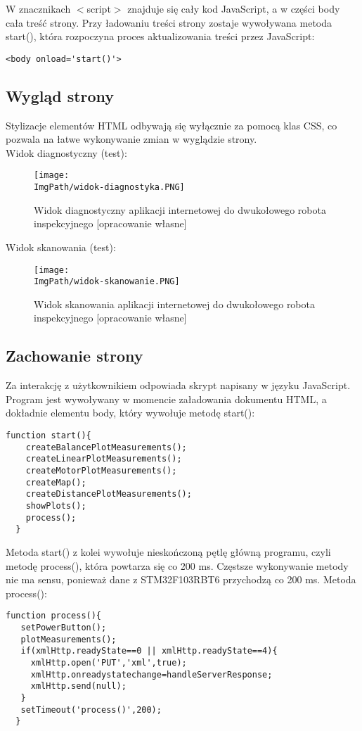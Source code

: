 \documentclass[a4paper,12pt,twoside,openany]{report}
\newcommand{\ImgPath}{.}
\begin{document}
W znacznikach $<$script$>$ znajduje się cały kod JavaScript, a w części body cała treść strony. Przy ładowaniu treści strony zostaje wywoływana metoda start(), która rozpoczyna proces aktualizowania treści przez JavaScript:
\begin{lstlisting}[style=customhtml]
<body onload='start()'>
\end{lstlisting}

\subsection{Wygląd strony}

Stylizacje elementów HTML odbywają się wyłącznie za pomocą klas CSS, co pozwala na łatwe wykonywanie zmian w wyglądzie strony.\\
Widok diagnostyczny (test):
\begin{figure}[!htbp]
	\begin{center}
\centering
\texttt{[image: \\ImgPath/widok-diagnostyka.PNG]}
\end{center}
	\caption{Widok diagnostyczny aplikacji internetowej do dwukołowego robota inspekcyjnego [opracowanie własne]}
	\label{schematKomunikacji}
\end{figure}

\newpage
\noindent Widok skanowania (test):
\begin{figure}[!htbp]
	\begin{center}
\centering
\texttt{[image: \\ImgPath/widok-skanowanie.PNG]}
\end{center}
	\caption{Widok skanowania aplikacji internetowej do dwukołowego robota inspekcyjnego [opracowanie własne]}
	\label{schematKomunikacji}
\end{figure}

\subsection{Zachowanie strony}

Za interakcję z użytkownikiem odpowiada skrypt napisany w języku JavaScript. Program jest wywoływany w momencie załadowania dokumentu HTML, a dokładnie elementu body, który wywołuje metodę start():
\begin{lstlisting}[style=customhtml]
  function start(){
    createBalancePlotMeasurements();
    createLinearPlotMeasurements();
    createMotorPlotMeasurements();
	createMap();
	createDistancePlotMeasurements();
	showPlots();
    process();
  }
\end{lstlisting}
Metoda start() z kolei wywołuje nieskończoną pętlę główną programu, czyli metodę process(), która powtarza się co 200 ms. Częstsze wykonywanie metody nie ma sensu, ponieważ dane z STM32F103RBT6 przychodzą co 200 ms. Metoda process():
\begin{lstlisting}[style=customhtml]
  function process(){
   setPowerButton();
   plotMeasurements();
   if(xmlHttp.readyState==0 || xmlHttp.readyState==4){
     xmlHttp.open('PUT','xml',true);
     xmlHttp.onreadystatechange=handleServerResponse;
     xmlHttp.send(null);
   }
   setTimeout('process()',200);
  }
\end{lstlisting}
\end{document}

